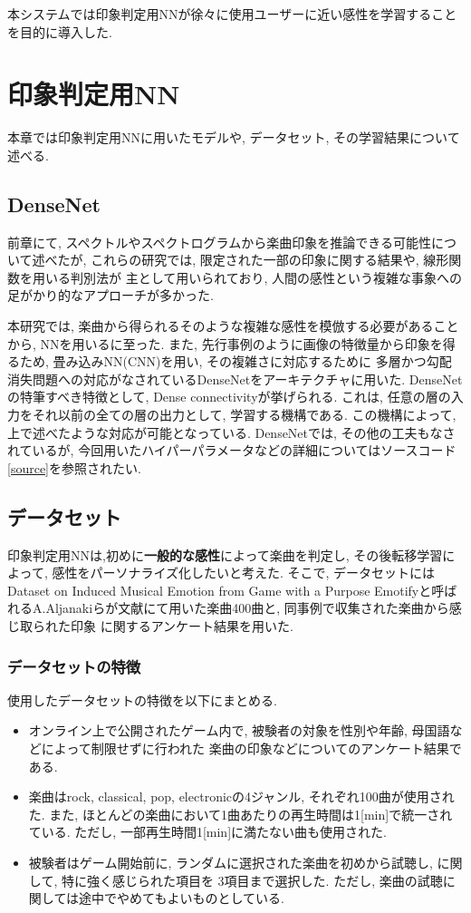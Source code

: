 \documentclass[a4paper,11pt,dvipdfmx]{jreport}
\begin{document}
本システムでは印象判定用NNが徐々に使用ユーザーに近い感性を学習することを目的に導入した.

\chapter{印象判定用NN}
本章では印象判定用NNに用いたモデルや, データセット, その学習結果について述べる.
\section{DenseNet}
前章にて, スペクトルやスペクトログラムから楽曲印象を推論できる可能性について述べたが, 
これらの研究\cite{Nagoya,Tokyo, Matsue}では, 限定された一部の印象に関する結果や, 線形関数を用いる判別法が
主として用いられており, 人間の感性という複雑な事象への足がかり的なアプローチが多かった.

本研究では, 楽曲から得られるそのような複雑な感性を模倣する必要があることから, NNを用いるに至った.
また, 先行事例のように画像の特徴量から印象を得るため, 畳み込みNN(CNN)を用い, その複雑さに対応するために
多層かつ勾配消失問題への対応がなされているDenseNet\cite{Dense}をアーキテクチャに用いた. 
DenseNetの特筆すべき特徴として, Dense connectivityが挙げられる.
これは, 任意の層の入力をそれ以前の全ての層の出力として, 学習する機構である.
この機構によって, 上で述べたような対応が可能となっている.
DenseNetでは, その他の工夫もなされているが, 今回用いたハイパーパラメータなどの詳細についてはソースコード\ref{source}を参照されたい.
\section{データセット}
印象判定用NNは,初めに\textbf{一般的な感性}によって楽曲を判定し, その後転移学習によって, 感性をパーソナライズ化したいと考えた.
そこで, データセットにはDataset on Induced Musical Emotion from Game with a Purpose Emotifyと呼ばれるA.Aljanakiらが文献\cite{game}にて用いた楽曲400曲と, 同事例で収集された楽曲から感じ取られた印象
に関するアンケート結果を用いた.
\subsection{データセットの特徴}
使用したデータセットの特徴を以下にまとめる.
\begin{itemize}
  \item オンライン上で公開されたゲーム内で, 被験者の対象を性別や年齢, 母国語などによって制限せずに行われた 
        楽曲の印象などについてのアンケート結果である.
  \item 楽曲はrock, classical, pop, electronicの4ジャンル, それぞれ100曲が使用された.
        また, ほとんどの楽曲において1曲あたりの再生時間は1[min]で統一されている. ただし, 一部再生時間1[min]に満たない曲も使用された.
  \item 被験者はゲーム開始前に, ランダムに選択された楽曲を初めから試聴し, に関して, 特に強く感じられた項目を
        3項目まで選択した. ただし, 楽曲の試聴に関しては途中でやめてもよいものとしている.
\end{itemize}
\end{document}
